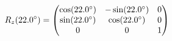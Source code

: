 \documentclass[preview]{standalone}
\begin{document}
\begin{align*}
\special{dvisvgm:raw <g id='unique000'>}R_z(22.0^\circ) = \begin{pmatrix} \cos(22.0^\circ) & -\sin(22.0^\circ) & 0 \\ \sin(22.0^\circ) & \cos(22.0^\circ) & 0 \\ 0 & 0 & 1 \end{pmatrix}\special{dvisvgm:raw </g>}
\end{align*}
\end{document}
